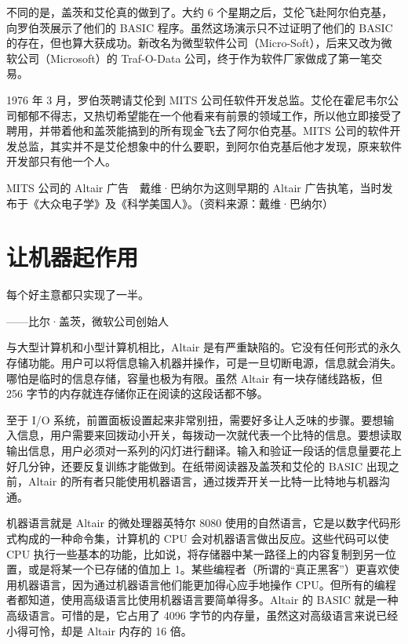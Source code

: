 \documentclass[12pt,UTF8]{ctexbook}
\begin{document}
不同的是，盖茨和艾伦真的做到了。大约 6 个星期之后，艾伦飞赴阿尔伯克基，向罗伯茨展示了他们的 BASIC 程序。虽然这场演示只不过证明了他们的 BASIC 的存在，但也算大获成功。新改名为微型软件公司（Micro-Soft），后来又改为微软公司（Microsoft）的 Traf-O-Data 公司，终于作为软件厂家做成了第一笔交易。

1976 年 3 月，罗伯茨聘请艾伦到 MITS 公司任软件开发总监。艾伦在霍尼韦尔公司郁郁不得志，又热切希望能在一个他看来有前景的领域工作，所以他立即接受了聘用，并带着他和盖茨能搞到的所有现金飞去了阿尔伯克基。MITS 公司的软件开发总监，其实并不是艾伦想象中的什么要职，到阿尔伯克基后他才发现，原来软件开发部只有他一个人。



MITS 公司的 Altair 广告　戴维·巴纳尔为这则早期的 Altair 广告执笔，当时发布于《大众电子学》及《科学美国人》。（资料来源：戴维·巴纳尔）





\section{让机器起作用}


每个好主意都只实现了一半。

——比尔·盖茨，微软公司创始人



与大型计算机和小型计算机相比，Altair 是有严重缺陷的。它没有任何形式的永久存储功能。用户可以将信息输入机器并操作，可是一旦切断电源，信息就会消失。哪怕是临时的信息存储，容量也极为有限。虽然 Altair 有一块存储线路板，但 256 字节的内存就连存储你正在阅读的这段话都不够。

至于 I/O 系统，前置面板设置起来非常别扭，需要好多让人乏味的步骤。要想输入信息，用户需要来回拨动小开关，每拨动一次就代表一个比特的信息。要想读取输出信息，用户必须对一系列的闪灯进行翻译。输入和验证一段话的信息量要花上好几分钟，还要反复训练才能做到。在纸带阅读器及盖茨和艾伦的 BASIC 出现之前，Altair 的所有者只能使用机器语言，通过拨弄开关一比特一比特地与机器沟通。

机器语言就是 Altair 的微处理器英特尔 8080 使用的自然语言，它是以数字代码形式构成的一种命令集，计算机的 CPU 会对机器语言做出反应。这些代码可以使 CPU 执行一些基本的功能，比如说，将存储器中某一路径上的内容复制到另一位置，或是将某一个已存储的值加上 1。某些编程者（所谓的“真正黑客”）更喜欢使用机器语言，因为通过机器语言他们能更加得心应手地操作 CPU。但所有的编程者都知道，使用高级语言比使用机器语言要简单得多。Altair 的 BASIC 就是一种高级语言。可惜的是，它占用了 4096 字节的内存量，虽然这对高级语言来说已经小得可怜，却是 Altair 内存的 16 倍。
\end{document}
